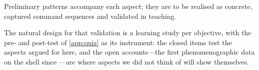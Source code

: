\rqpatterns*
Preliminary patterns accompany each aspect; they are to be realised as
concrete, captured command sequences and validated in teaching.

The natural design for that validation is a learning study
\autocite[Ch.~7]{NCOL} per objective, with the pre- and post-test of
\cref{app:quiz} as its instrument: the closed items test the aspects
argued for here, and the open accounts---the first phenomenographic data
on the shell since \textcite{DoyleLister2006Unix}---are where aspects we
did not think of will show themselves.
